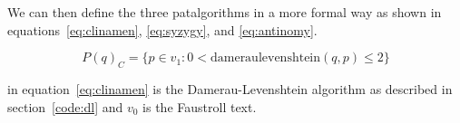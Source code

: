 
We can then define the three patalgorithms in a more formal way as shown in equations~\ref{eq:clinamen}, \ref{eq:syzygy}, and \ref{eq:antinomy}.

\begin{equation}
  P(q)_C = \{p \in v_1: 0 < \text{dameraulevenshtein}(q,p) \leq 2\}
  \label{eq:clinamen}
\end{equation}

 in equation~\ref{eq:clinamen}\sidepar{$\bm{\Sigma}$~\ref{eq:clinamen}} is the Damerau-Levenshtein algorithm as described in section~\ref{code:dl} and $v_0$ is the Faustroll text.

